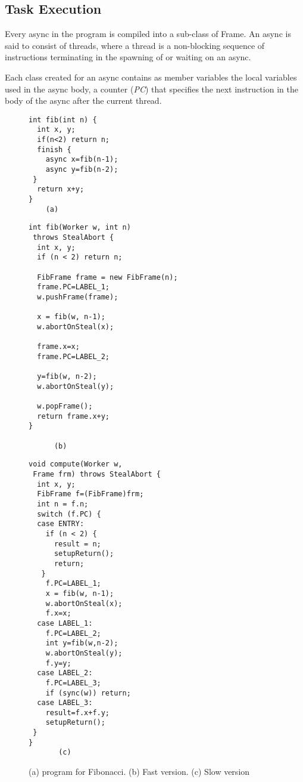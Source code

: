 
\subsection{Task Execution}

Every async in the \Xten{} program is compiled into a sub-class of
Frame. An async is said to consist of threads, where a thread is a
non-blocking sequence of instructions terminating in the spawning of or
waiting on an async. 

Each class created for an async contains as member variables the local
variables used in the async body, a counter ({\em PC}) that specifies
the next instruction in the body of the async after the current
thread.

\begin{figure*}
\begin{minipage}{0.25\textwidth}
\scriptsize
\begin{verbatim}
int fib(int n) {
  int x, y;
  if(n<2) return n;
  finish {
    async x=fib(n-1);
    async y=fib(n-2);
 }
  return x+y;
}
    (a)
\end{verbatim}
\end{minipage}%
\begin{minipage}{0.4\textwidth}
\scriptsize
\begin{verbatim}
int fib(Worker w, int n) 
 throws StealAbort { 
  int x, y;
  if (n < 2) return n;

  FibFrame frame = new FibFrame(n);
  frame.PC=LABEL_1;
  w.pushFrame(frame);

  x = fib(w, n-1);
  w.abortOnSteal(x);

  frame.x=x;
  frame.PC=LABEL_2;

  y=fib(w, n-2);
  w.abortOnSteal(y);

  w.popFrame();
  return frame.x+y;
}

      (b)
\end{verbatim}
\end{minipage}%
\begin{minipage}{0.45\textwidth}
\scriptsize
\begin{verbatim}
void compute(Worker w, 
 Frame frm) throws StealAbort {
  int x, y;
  FibFrame f=(FibFrame)frm;
  int n = f.n;
  switch (f.PC) {
  case ENTRY: 
    if (n < 2) {
      result = n;
      setupReturn();
      return;
   }
    f.PC=LABEL_1;
    x = fib(w, n-1);
    w.abortOnSteal(x);
    f.x=x;
  case LABEL_1: 
    f.PC=LABEL_2;
    int y=fib(w,n-2);
    w.abortOnSteal(y);
    f.y=y;
  case LABEL_2: 
    f.PC=LABEL_3;
    if (sync(w)) return;
  case LABEL_3:
    result=f.x+f.y;
    setupReturn();
 }
}
       (c)
\end{verbatim}
\end{minipage}%
\caption{(a) \Xten{} program for Fibonacci. (b) Fast version. (c) Slow version}%
\label{fig:fib-ill}
\end{figure*}

